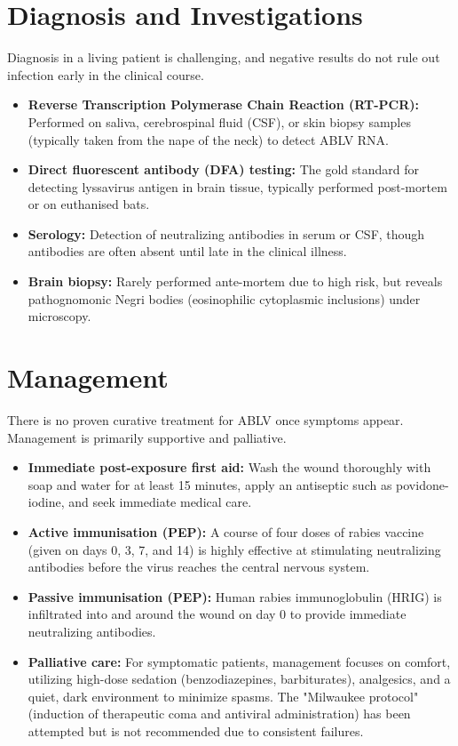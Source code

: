 \section*{Diagnosis and Investigations}
Diagnosis in a living patient is challenging, and negative results do not rule out infection early in the clinical course.
\begin{itemize}
    \item \textbf{Reverse Transcription Polymerase Chain Reaction (RT-PCR):} Performed on saliva, cerebrospinal fluid (CSF), or skin biopsy samples (typically taken from the nape of the neck) to detect ABLV RNA.
    \item \textbf{Direct fluorescent antibody (DFA) testing:} The gold standard for detecting lyssavirus antigen in brain tissue, typically performed post-mortem or on euthanised bats.
    \item \textbf{Serology:} Detection of neutralizing antibodies in serum or CSF, though antibodies are often absent until late in the clinical illness.
    \item \textbf{Brain biopsy:} Rarely performed ante-mortem due to high risk, but reveals pathognomonic Negri bodies (eosinophilic cytoplasmic inclusions) under microscopy.
\end{itemize}

\section*{Management}
There is no proven curative treatment for ABLV once symptoms appear. Management is primarily supportive and palliative.
\begin{itemize}
    \item \textbf{Immediate post-exposure first aid:} Wash the wound thoroughly with soap and water for at least 15 minutes, apply an antiseptic such as povidone-iodine, and seek immediate medical care.
    \item \textbf{Active immunisation (PEP):} A course of four doses of rabies vaccine (given on days 0, 3, 7, and 14) is highly effective at stimulating neutralizing antibodies before the virus reaches the central nervous system.
    \item \textbf{Passive immunisation (PEP):} Human rabies immunoglobulin (HRIG) is infiltrated into and around the wound on day 0 to provide immediate neutralizing antibodies.
    \item \textbf{Palliative care:} For symptomatic patients, management focuses on comfort, utilizing high-dose sedation (benzodiazepines, barbiturates), analgesics, and a quiet, dark environment to minimize spasms. The "Milwaukee protocol" (induction of therapeutic coma and antiviral administration) has been attempted but is not recommended due to consistent failures.
\end{itemize}

